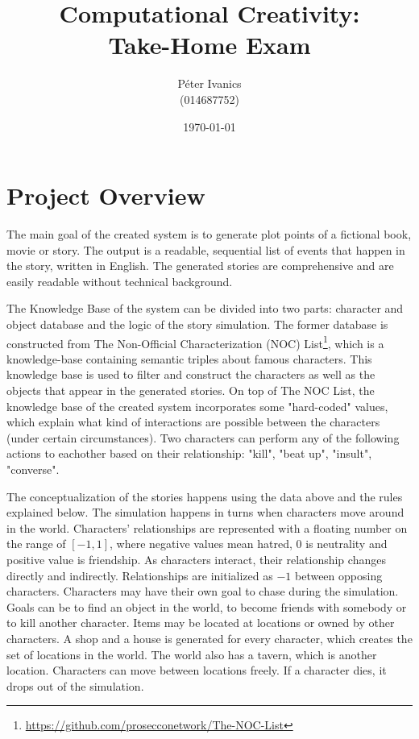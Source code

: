\documentclass[english]{tktltiki}
\begin{document}
    \singlespacing
    
    \title{Computational Creativity: \\
    Take-Home Exam}
    
    \author{P\'eter Ivanics \\
    (014687752)}
    
    \date{\today}
    
    \maketitle
    
    
    \section{Project Overview}
    The main goal of the created system is to generate plot points of a fictional book, movie or story. The output is a readable, sequential list of events that happen in the story, written in English. The generated stories are comprehensive and are easily readable without technical background. 
    
    The Knowledge Base of the system can be divided into two parts: character and object database and the logic of the story simulation. The former database is constructed from The Non-Official Characterization (NOC) List\footnote{\url{https://github.com/prosecconetwork/The-NOC-List}}, which is a knowledge-base containing semantic triples about famous characters. This knowledge base is used to filter and construct the characters as well as the objects that appear in the generated stories. On top of The NOC List, the knowledge base of the created system incorporates some "hard-coded" values, which explain what kind of interactions are possible between the characters (under certain circumstances). Two characters can perform any of the following actions to eachother based on their relationship: "kill", "beat up", "insult", "converse".
    
    The conceptualization of the stories happens using the data above and the rules explained below. The simulation happens in turns when characters move around in the world.  Characters' relationships are represented with a floating number on the range of $[-1, 1]$, where negative values mean hatred, $0$ is neutrality and positive value is friendship. As characters interact, their relationship changes directly and indirectly. Relationships are initialized as $-1$ between opposing characters. Characters may have their own goal to chase during the simulation. Goals can be to find an object in the world, to become friends with somebody or to kill another character. Items may be located at locations or owned by other characters. A shop and a house is generated for every character, which creates the set of locations in the world. The world also has a tavern, which is another location. Characters can move between locations freely. If a character dies, it drops out of the simulation. 
\end{document}

